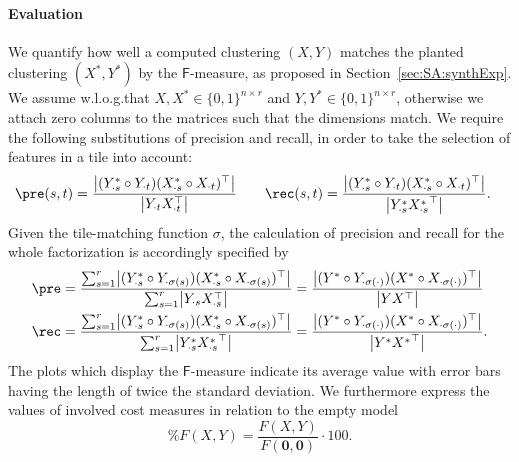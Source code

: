 \paragraph{Evaluation}
We quantify how well a computed clustering $(X,Y)$  matches the planted clustering $(X^*,Y^*)$ by the $\mathsf{F}$-measure, as proposed in Section~\ref{sec:SA:synthExp}.
We assume w.l.o.g.\@ that $X,X^*\in\{0,1\}^{n\times r}$ and $Y,Y^*\in\{0,1\}^{n\times r}$, otherwise we attach zero columns to the matrices such that the dimensions match. We require the following substitutions of precision and recall, in order to take the selection of features in a tile into account:
\begin{align*}
	\pre(s,t) &= \frac{\bigl\lvert(Y^*_{\cdot s}\circ Y_{\cdot t})(X^*_{\cdot s}\circ X_{\cdot t})^\top \bigr\rvert}{\bigl\lvert Y_{\cdot t}X_{\cdot t}^\top \bigr\rvert} &\quad 
    \rec(s,t) &= \frac{\bigl\lvert(Y^*_{\cdot s}\circ Y_{\cdot t})(X^*_{\cdot s}\circ X_{\cdot t})^\top \bigr\rvert}{\bigl\lvert Y^*_{\cdot s}{X^*_{\cdot s}}^\top \bigr\rvert}. 
\end{align*}
Given the tile-matching function $\sigma$, the calculation of precision and recall for the whole factorization is accordingly specified by
\begin{align*}
\pre &= \frac{\sum_{s=1}^r\bigl\lvert(Y^*_{\cdot s}\circ Y_{\cdot \sigma(s)})(X^*_{\cdot s}\circ X_{\cdot \sigma(s)})^\top \bigr\rvert}{\sum_{s=1}^r\bigl\lvert Y_{\cdot s}X_{\cdot s}^\top \bigr\rvert} 
= \frac{\bigl\lvert(Y^*\circ Y_{\cdot \sigma(\cdot)})(X^*\circ X_{\cdot \sigma(\cdot)})^\top \bigr\rvert}{\bigl\lvert YX^\top \bigr\rvert}\\ 
\rec 
&= \frac{\sum_{s=1}^r\bigl\lvert(Y^*_{\cdot s}\circ Y_{\cdot \sigma(s)})(X^*_{\cdot s}\circ X_{\cdot \sigma(s)})^\top \bigr\rvert}{\sum_{s=1}^r\bigl\lvert Y_{\cdot s}^* {X_{\cdot s}^*}^\top \bigr\rvert} 
= \frac{\bigl\lvert(Y^*\circ Y_{\cdot\sigma(\cdot)})(X^*\circ X_{\cdot \sigma(\cdot)})^\top \bigr\rvert}{\bigl\lvert Y^*{X^*}^\top \bigr\rvert}.
\end{align*}
The plots which display the $\mathsf{F}$-measure indicate its average value with error bars having the length of twice the standard deviation.
We furthermore express the values of involved cost measures in relation to the empty model
\[
	\%F(X,Y) = \frac{F(X,Y)}{F(\mathbf{0},\mathbf{0})}\cdot 100.
\]
